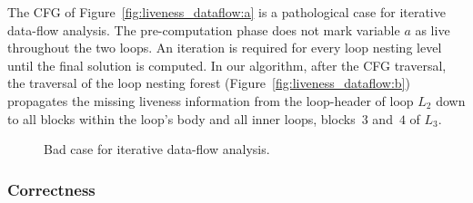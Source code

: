 \begin{example}
	The CFG of Figure~\ref{fig:liveness_dataflow:a} is a pathological case for iterative data-flow analysis.
        The pre-computation phase does not mark variable $a$ as live 
        throughout the two loops.
	An iteration is required for every loop nesting level until the final solution is computed.
	In our algorithm, after the CFG traversal, the traversal of the loop nesting forest (Figure~\ref{fig:liveness_dataflow:b}) propagates the missing liveness information from the loop-header of loop $L_2$ down to all blocks within the loop's body and all inner loops, \ie blocks~$3$ and~$4$ of $L_3$.
\end{example}

\begin{figure}[t]
   \begin{center}
     \hfill
     \hfill
     \hfill\null
   \end{center}
   \caption{Bad case for iterative data-flow analysis.}
   \label{fig:liveness_dataflow}
\end{figure}


\subsubsection{Correctness}
\label{sec:correctnessdebase}



